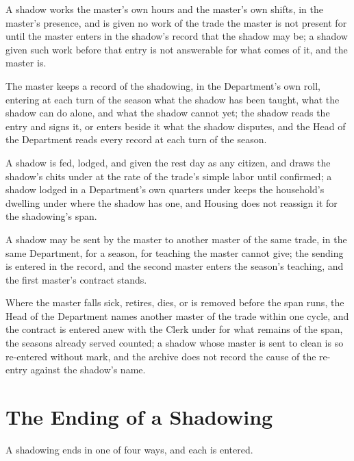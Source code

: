 \begin{clauses}
\item A shadow works the master's own hours and the master's own shifts, in the master's presence, and is given no work of the trade the master is not present for until the master enters in the shadow's record that the shadow may be; a shadow given such work before that entry is not answerable for what comes of it, and the master is.
\item The master keeps a record of the shadowing, in the Department's own roll, entering at each turn of the season what the shadow has been taught, what the shadow can do alone, and what the shadow cannot yet; the shadow reads the entry and signs it, or enters beside it what the shadow disputes, and the Head of the Department reads every record at each turn of the season.
\item A shadow is fed, lodged, and given the rest day as any citizen, and draws the shadow's chits under  at the rate of the trade's simple labor until confirmed; a shadow lodged in a Department's own quarters under  keeps the household's dwelling under  where the shadow has one, and Housing does not reassign it for the shadowing's span.
\item A shadow may be sent by the master to another master of the same trade, in the same Department, for a season, for teaching the master cannot give; the sending is entered in the record, and the second master enters the season's teaching, and the first master's contract stands.
\item Where the master falls sick, retires, dies, or is removed before the span runs, the Head of the Department names another master of the trade within one cycle, and the contract is entered anew with the Clerk under  for what remains of the span, the seasons already served counted; a shadow whose master is sent to clean is so re-entered without mark, and the archive does not record the cause of the re-entry against the shadow's name.
\end{clauses}

\section{The Ending of a Shadowing}
\label{sec:labor:ending-of-a-shadowing}

A shadowing ends in one of four ways, and each is entered.

